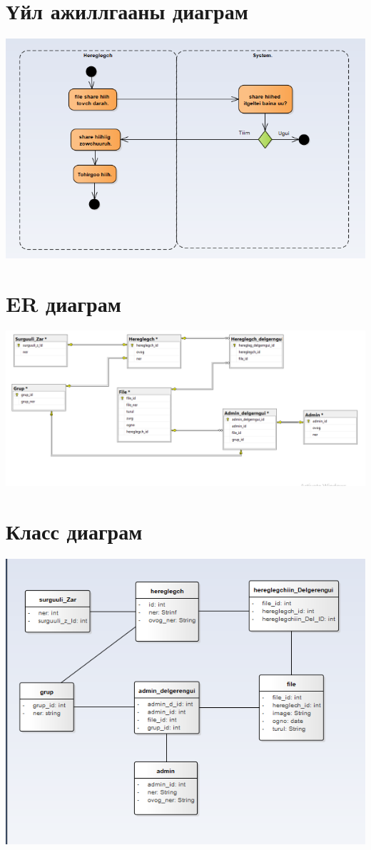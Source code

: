 \documentclass[12pt]{article}
\begin{document}
\begin{itemize}
    \section{Үйл ажиллгааны  диаграм}
    \includegraphics[scale=0.80]{image/Activity_diagram.PNG}
    \section{ER диаграм}
    \includegraphics[scale=0.50]{image/ERdiagram.PNG}
    \section{Класс диаграм}
    \includegraphics[scale=0.80]{image/class.PNG}

\end{itemize}
\end{document}
